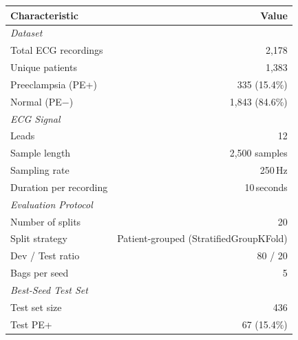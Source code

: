 \documentclass[border=8pt]{standalone}
\begin{document}
\begin{tabular}{l r}
\toprule
\textbf{Characteristic} & \textbf{Value} \\
\midrule
\multicolumn{2}{l}{\textit{Dataset}} \\
\quad Total ECG recordings & 2,178 \\
\quad Unique patients & 1,383 \\
\quad Preeclampsia (PE+) & 335 (15.4\%) \\
\quad Normal (PE$-$) & 1,843 (84.6\%) \\
\midrule
\multicolumn{2}{l}{\textit{ECG Signal}} \\
\quad Leads & 12 \\
\quad Sample length & 2{,}500 samples \\
\quad Sampling rate & 250\,Hz \\
\quad Duration per recording & 10\,seconds \\
\midrule
\multicolumn{2}{l}{\textit{Evaluation Protocol}} \\
\quad Number of splits & 20 \\
\quad Split strategy & Patient-grouped (StratifiedGroupKFold) \\
\quad Dev / Test ratio & 80 / 20 \\
\quad Bags per seed & 5 \\
\midrule
\multicolumn{2}{l}{\textit{Best-Seed Test Set}} \\
\quad Test set size & 436 \\
\quad Test PE+ & 67 (15.4\%) \\
\bottomrule
\end{tabular}
\end{document}
